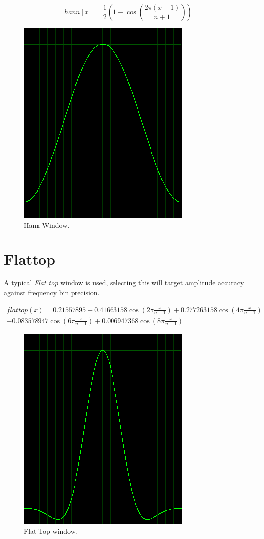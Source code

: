 \documentclass[10pt,a4paper]{report}
\begin{document}
\begin{appendices}
\begin{equation}
hann[x] = \frac{1}{2}(1 - \cos(\frac{2\pi(x+1)}{n+1}))
\end{equation}

\begin{figure}[H]
	\centering
	\includegraphics[width=0.4\linewidth]{images/windows/window-hann.png}
	\caption[Hann Window]{Hann Window.}
	\label{fig:window-hann}
\end{figure}

\section{Flattop}
A typical \textit{Flat top} window is used, selecting this will target amplitude accuracy against frequency bin precision.

\begin{align*}
flattop(x)=0.21557895 - 0.41663158\cos(2\pi\frac{x}{n-1})+ 0.277263158\cos(4\pi\frac{x}{n-1})\\
- 0.083578947\cos(6\pi\frac{x}{n-1}) + 0.006947368\cos(8\pi\frac{x}{n-1})
\end{align*}

\begin{figure}[H]
	\centering
	\includegraphics[width=0.4\linewidth]{images/windows/window-flattop.png}
	\caption[Flat Top window]{Flat Top window.}
	\label{fig:window-flattop}
\end{figure}


\end{appendices}
\end{document}
